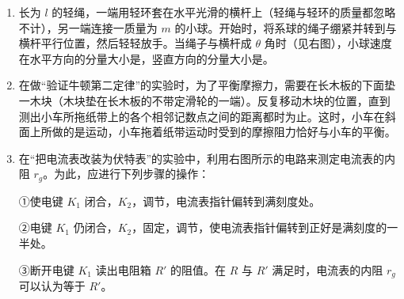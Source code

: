 \documentclass[\gkver]{gaokaozhenti}
\begin{document}
\begin{enumerate}


\item
长为 $l$ 的轻绳，一端用轻环套在水平光滑的横杆上（轻绳与轻环的质量都忽略不计），另一端连接一质量为 $m$ 的小球。开始时，将系球的绳子绷紧并转到与横杆平行位置，然后轻轻放手。当绳子与横杆成 $\theta$ 角时（见右图），小球速度在水平方向的分量大小是，竖直方向的分量大小是。
\onepicture[align=right, w=4.05cm]{}


\item
在做“验证牛顿第二定律”的实验时，为了平衡摩擦力，需要在长木板的下面垫一木块（木块垫在长木板的不带定滑轮的一端）。反复移动木块的位置，直到测出小车所拖纸带上的各个相邻记数点之间的距离都时为止。这时，小车在斜面上所做的是运动，小车拖着纸带运动时受到的摩擦阻力恰好与小车的平衡。


\item
在“把电流表改装为伏特表”的实验中，利用右图所示的电路来测定电流表的内阻 $r_{g}$。为此，应进行下列步骤的操作：

①使电键 $K_{1}$ 闭合，$K_{2}$，调节，电流表指针偏转到满刻度处。

②电键 $K_{1}$ 仍闭合，$K_{2}$，固定，调节，使电流表指针偏转到正好是满刻度的一半处。

③断开电键 $K_{1}$ 读出电阻箱 $R'$ 的阻值。在 $R$ 与 $R'$ 满足时，电流表的内阻 $r_{g}$ 可以认为等于 $R'$。
\onepicture[align=right, w=4.15cm]{}


\end{enumerate}
\end{document}
